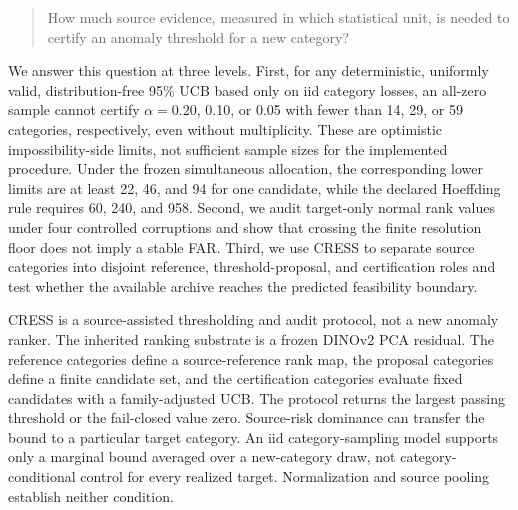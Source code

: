 \begin{quote}
How much source evidence, measured in which statistical unit, is needed to certify an anomaly threshold for a new category?
\end{quote}

We answer this question at three levels. First, for any deterministic, uniformly valid, distribution-free 95\% UCB based only on iid category losses, an all-zero sample cannot certify $\alpha=0.20$, 0.10, or 0.05 with fewer than 14, 29, or 59 categories, respectively, even without multiplicity. These are optimistic impossibility-side limits, not sufficient sample sizes for the implemented procedure. Under the frozen simultaneous allocation, the corresponding lower limits are at least 22, 46, and 94 for one candidate, while the declared Hoeffding rule requires 60, 240, and 958. Second, we audit target-only normal rank values under four controlled corruptions and show that crossing the finite resolution floor does not imply a stable FAR\@. Third, we use CRESS to separate source categories into disjoint reference, threshold-proposal, and certification roles and test whether the available archive reaches the predicted feasibility boundary.

CRESS is a source-assisted thresholding and audit protocol, not a new anomaly ranker. The inherited ranking substrate is a frozen DINOv2 PCA residual. The reference categories define a source-reference rank map, the proposal categories define a finite candidate set, and the certification categories evaluate fixed candidates with a family-adjusted UCB\@. The protocol returns the largest passing threshold or the fail-closed value zero. Source-risk dominance can transfer the bound to a particular target category. An iid category-sampling model supports only a marginal bound averaged over a new-category draw, not category-conditional control for every realized target. Normalization and source pooling establish neither condition.

